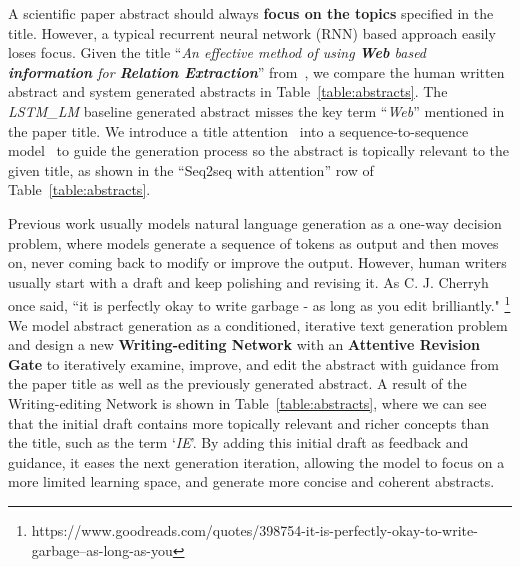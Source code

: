 \documentclass[11pt,a4paper]{article}
\begin{document}
A scientific paper abstract should always \textbf{focus on the topics} specified in the title.
However, a typical recurrent neural network (RNN) based approach easily loses focus. Given the title ``\textit{An effective method of using \textbf{Web} based \textbf{information} for \textbf{Relation Extraction}}'' from~, we compare the human written abstract and system generated abstracts in Table~\ref{table:abstracts}. The \textit{LSTM\_LM} baseline generated abstract misses the key term ``\textit{Web}'' mentioned in the paper title. We introduce a title attention~ \citep{atten14, luong2015effective} into a sequence-to-sequence model~\cite{seq2seq14,cho2014learning} to guide the generation process so the abstract is topically relevant to the given title, as shown in the ``Seq2seq with attention'' row of Table~\ref{table:abstracts}.


Previous work usually models natural language generation as a one-way decision problem, where models generate a sequence of tokens as output and then moves on, never coming back to modify or improve the output. 
However, human writers usually start with a draft and keep polishing and revising it. As C. J. Cherryh once said, ``it is perfectly okay to write garbage - as long as you edit brilliantly." \footnote{https://www.goodreads.com/quotes/398754-it-is-perfectly-okay-to-write-garbage--as-long-as-you}
We model abstract generation as a conditioned, iterative text generation problem and design a new \textbf{Writing-editing Network} with an \textbf{Attentive Revision Gate} to iteratively examine, improve, and edit the abstract with guidance from the paper title as well as the previously generated abstract. A result of the Writing-editing Network is shown in Table~\ref{table:abstracts}, where we can see that the initial draft contains more topically relevant and richer concepts than the title, such as the term `\textit{IE}'. By adding this initial draft as feedback and guidance, it eases the next generation iteration, allowing the model to focus on a more limited learning space, and generate more concise and coherent abstracts. 
\end{document}
